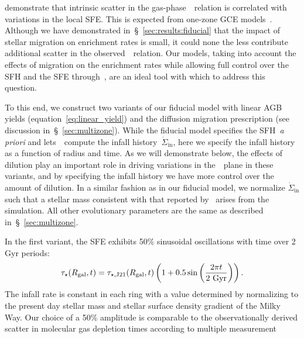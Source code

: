 \documentclass[ms.tex]{subfiles}
\begin{document}
\citet{Schaefer2020} demonstrate that intrinsic scatter in the
gas-phase~\ohno~relation is correlated with variations in the local SFE.
This is expected from one-zone GCE models~\citep[e.g.][]{Molla2006,
Vincenzo2016a}.
Although we have demonstrated in~\S~\ref{sec:results:fiducial} that the impact
of stellar migration on enrichment rates is small, it could none the less
contribute additional scatter in the observed~\ohno~relation.
Our models, taking into account the effects of migration on the
enrichment rates while allowing full control over the SFH and the SFE
through~\vice, are an ideal tool with which to address this question.
\par
To this end, we construct two variants of our fiducial model
with linear AGB yields (equation~\ref{eq:linear_yield}) and the
diffusion migration prescription (see discussion in~\S~\ref{sec:multizone}).
While the fiducial model specifies the SFH~\textit{a priori} and
lets~\vice~compute the infall history~$\dot{\Sigma}_\text{in}$, here we specify
the infall history as a function of radius and time.
As we will demonstrate below, the effects of dilution play an important role in
driving variations in the~\ohno~plane in these variants, and by specifying the
infall history we have more control over the amount of dilution.
In a similar fashion as in our fiducial model, we normalize
$\dot{\Sigma}_\text{in}$ such that a stellar mass consistent with that reported
by~\citet{Licquia2015} arises from the simulation.
All other evolutionary parameters are the same as described
in~\S~\ref{sec:multizone}.
\par
In the first variant, the SFE exhibits 50\% sinusoidal oscillations with time
over 2 Gyr periods:
\begin{equation}
\tau_\star(R_\text{gal}, t) = \tau_{\star,\text{J21}}(R_\text{gal}, t)
\left(1 + 0.5\sin\left(\frac{2\pi t}{2~\text{Gyr}}\right)\right).
\label{eq:sfe_var}
\end{equation}
The infall rate is constant in each ring with a value determined by normalizing
to the present day stellar mass and stellar surface density gradient of the
Milky Way.
Our choice of a 50\% amplitude is comparable to the observationally derived
scatter in molecular gas depletion times according to multiple measurement
\end{document}
